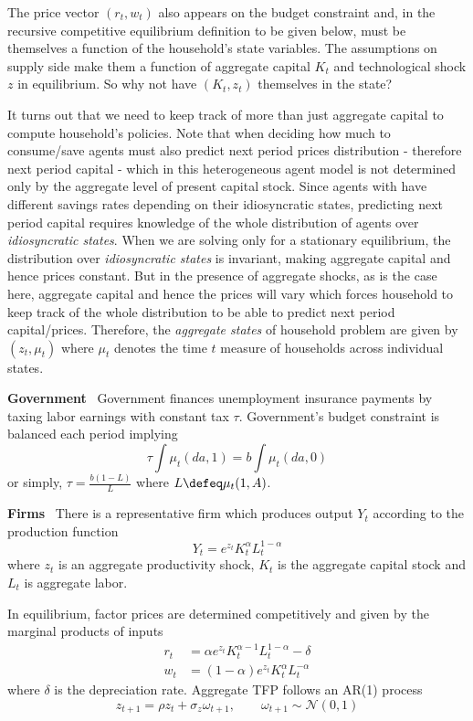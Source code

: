 \documentclass[a4paper,10pt]{article}  %
\begin{document}
The price vector $( r_t, w_t )$ also appears on the budget constraint and, in the recursive competitive equilibrium
definition to be given below, must be themselves a function of the household's state variables.
The assumptions on supply side make them a function of aggregate capital $K_t$ and technological shock $z$ in equilibrium.
So why not have $(K_t,z_t)$ themselves in the state?

It turns out that we need to keep track of more than just aggregate capital to compute household's policies.
Note that when deciding how much to consume/save agents must also predict next period prices distribution - therefore
next period capital - which in this heterogeneous agent model is not determined only by the aggregate level of present capital stock.
Since agents with have different savings rates depending on their idiosyncratic states, predicting next period capital
requires knowledge of the whole distribution of agents over \emph{idiosyncratic states}.
When we are solving only for a stationary equilibrium, the distribution over \emph{idiosyncratic states} is invariant,
making aggregate capital and hence prices constant. But in the presence of aggregate shocks, as is the case here,
aggregate capital and hence the prices will vary which forces household to keep track of the whole distribution
to be able to predict next period capital/prices.
Therefore, the \emph{aggregate states} of household problem are given by $ (z_t, \mu_t ) $ where
$ \mu_t $ denotes the time $t$ measure of households across individual states.


\textbf{Government} \ Government finances unemployment insurance payments by taxing labor earnings with constant tax $\tau$.
Government's budget constraint is balanced each period implying
\begin{equation*}
   \label{eq:gov_budget}
   \tau \int \mu_t( da,1 ) = b \int \mu_t( da,0 )
\end{equation*}
or simply, $ \tau = \frac{b ( 1-L )}{L} $ where $ L \defeq \mu_t( 1, A) $.

\bigskip
\textbf{Firms} \ There is a representative firm which produces output $ Y_t $ according to the production function
\begin{equation*}
   \label{eq:prod_fnc}
   Y_t = e^{z_t} K_t^{\alpha} L_t^{ 1- \alpha }
\end{equation*}
where $ z_t $ is an aggregate productivity shock, $K_t$ is the aggregate capital stock and $ L_t $ is aggregate labor.

In equilibrium, factor prices are determined competitively and given by the marginal products of inputs
\begin{align*}
   \label{eq:factor_prices}
   r_t & = \alpha e^{z_t} K_t^{ \alpha-1 } L_t^{ 1- \alpha } - \delta \\
   w_t & = ( 1- \alpha ) e^{z_t} K_t^{ \alpha } L_t^{ - \alpha }
\end{align*}
%
where $ \delta $ is the depreciation rate. Aggregate TFP follows an AR(1) process
\begin{equation}
   \label{eq:tfp}
   z_{t+1} = \rho z_t + \sigma_z \omega_{t+1}, \qquad \omega_{t+1} \sim \mathcal{N}( 0,1 )
\end{equation}
\end{document}
